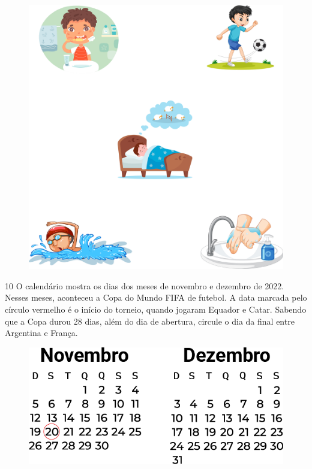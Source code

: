 \begin{figure}[htpb!]
\centering
\includegraphics[width=.8\textwidth]{./media/image57.png}
\end{figure}


\pagebreak

\num{10} O calendário mostra os dias dos meses de novembro e dezembro de
2022. Nesses meses, aconteceu a Copa do Mundo FIFA de futebol. A data
marcada pelo círculo vermelho é o início do torneio, quando jogaram
Equador e Catar. Sabendo que a Copa durou 28 dias, além do dia de abertura, circule o dia da
final entre Argentina e França.


\begin{figure}[htpb!]
\includegraphics[width=\textwidth]{./media/image59.png}
\end{figure}

